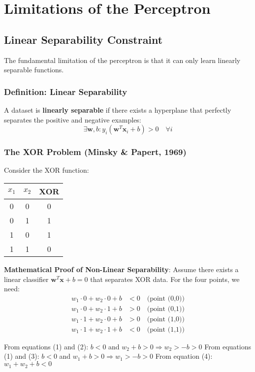 \section{Limitations of the Perceptron}
\subsection{Linear Separability Constraint}
The fundamental limitation of the perceptron is that it can only learn linearly separable functions.

\subsubsection{Definition: Linear Separability}
A dataset is \textbf{linearly separable} if there exists a hyperplane that perfectly separates the positive and negative examples:
\[\exists \mathbf{w}, b : y_i(\mathbf{w}^T \mathbf{x}_i + b) > 0 \quad \forall i\]

\subsubsection{The XOR Problem (Minsky \& Papert, 1969)}
Consider the XOR function:
\begin{center}
\begin{tabular}{|c|c|c|}
\hline
\(x_1\) & \(x_2\) & XOR \\
\hline
0 & 0 & 0 \\
0 & 1 & 1 \\
1 & 0 & 1 \\
1 & 1 & 0 \\
\hline
\end{tabular}
\end{center}

\textbf{Mathematical Proof of Non-Linear Separability}:
Assume there exists a linear classifier \(\mathbf{w}^T \mathbf{x} + b = 0\) that separates XOR data.
For the four points, we need:
\begin{align}
w_1 \cdot 0 + w_2 \cdot 0 + b &< 0 \quad \text{(point (0,0))} \\
w_1 \cdot 0 + w_2 \cdot 1 + b &> 0 \quad \text{(point (0,1))} \\
w_1 \cdot 1 + w_2 \cdot 0 + b &> 0 \quad \text{(point (1,0))} \\
w_1 \cdot 1 + w_2 \cdot 1 + b &< 0 \quad \text{(point (1,1))}
\end{align}

From equations (1) and (2): \(b < 0\) and \(w_2 + b > 0 \Rightarrow w_2 > -b > 0\)
From equations (1) and (3): \(b < 0\) and \(w_1 + b > 0 \Rightarrow w_1 > -b > 0\)
From equation (4): \(w_1 + w_2 + b < 0\)


